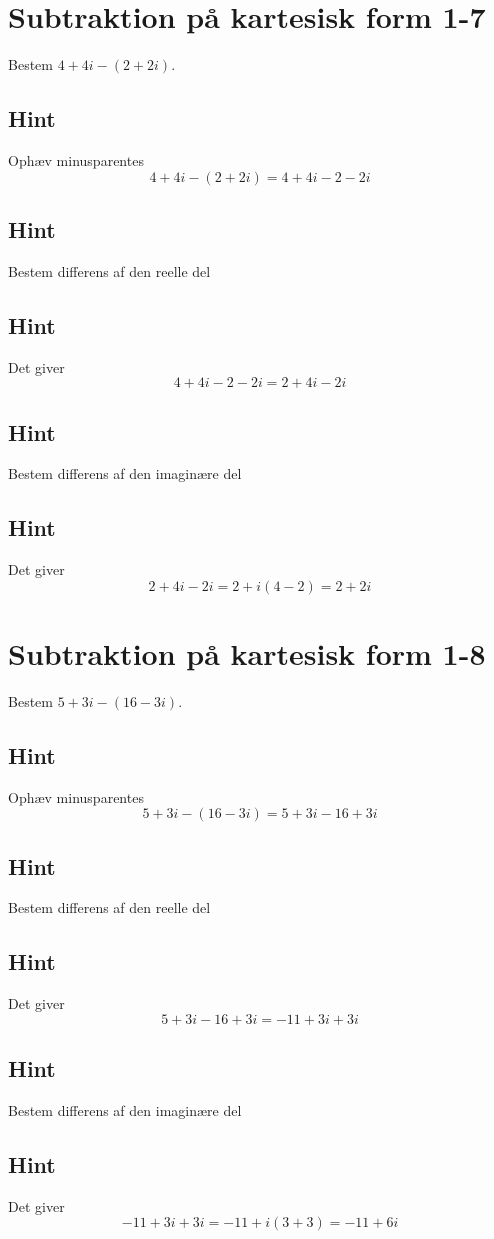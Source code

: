 \documentclass{article}
\newenvironment{exercise}[1]{\newpage\section{#1}}{}
\newcommand{\answerbox}[1]{\fbox{$#1$}}
\newcommand{\hint}{\subsection*{Hint}}
\begin{document}
\newpage

\begin{exercise}{Subtraktion på kartesisk form 1-7}
	
	Bestem $4+4i-(2+2i)$.
	
	\answerbox{2 + 2i}
	
	\hint
	
	Ophæv minusparentes
	\[
	4+4i-(2+2i) = 4 + 4i - 2 -2i
	\]
	
	\hint
	
	Bestem differens af den reelle del
	
	\hint
	
	Det giver
	\[
	4 + 4i - 2 -2i = 2 + 4i - 2i
	\]
	
	\hint
	
	Bestem differens af den imaginære del 
	
	
	\hint
	
	Det giver 
	\[
	2 + 4i - 2i = 2 + i(4-2) = 2 + 2i
 	\]
	
\end{exercise}

\newpage

\begin{exercise}{Subtraktion på kartesisk form 1-8}
	
	Bestem $5+3i - (16 - 3i)$.
	
	\answerbox{-11 + 6i}
	
	\hint
	
	Ophæv minusparentes
	\[
	5+3i - (16 - 3i) = 	5 + 3i - 16 + 3i
	\]
	
	\hint
	
	Bestem differens af den reelle del
	
	\hint
	
	Det giver
	\[
	5 + 3i - 16 + 3i = - 11 + 3i + 3i
	\]
	
	\hint
	
	Bestem differens af den imaginære del 
	
	
	\hint
	
	Det giver 
	\[
	- 11 + 3i + 3i = -11 +i(3+3) = -11 + 6i
	\]
	
\end{exercise}
\end{document}
